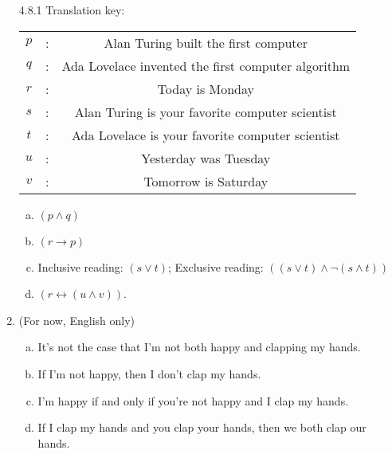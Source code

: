 \begin{enumerate}
	
		\item[4.8.1] Translation key:
		
				\begin{longtable}{c c c}
				$p$ & : & Alan Turing built the first computer\\
				$q$ & : & Ada Lovelace invented the first computer algorithm\\
				$r$ & : & Today is Monday\\
				$s$ & : & Alan Turing is your favorite computer scientist\\
				$t$ & : & Ada Lovelace is your favorite computer scientist\\
				$u$ & : & Yesterday was Tuesday\\
				$v$ & : & Tomorrow is Saturday\\				
			\end{longtable}
		
		\begin{enumerate}[(a)]
		
			\item $(p\land q)$
			
			\item $(r\to p)$
			
			\item Inclusive reading: $(s\lor t)$; Exclusive reading: $((s\lor t)\land\neg(s\land t))$
			
			\item $(r\leftrightarrow (u\land v))$.
		
		\end{enumerate}
		
		
		\item (For now, English only)
		
			\begin{enumerate}[(a)]
			
				\item It's not the case that I'm not both happy and clapping my hands.
				
				\item If I'm not happy, then I don't clap my hands.
				
				\item I'm happy if and only if you're not happy and I clap my hands.
				
				\item If I clap my hands and you clap your hands, then we both clap our hands.
				

\end{enumerate}
\end{enumerate}

